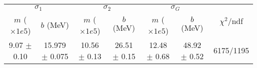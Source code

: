 \begin{tabular}{cc|cc|cc||c}
\multicolumn{2}{c|}{$\sigma_1$} & \multicolumn{2}{|c}{$\sigma_2$} & \multicolumn{2}{|c}{$\sigma_G$}  & \multirow{2}{*}{$\chi^2/$ndf}\\
$m$ ($\times1e5$) & $b$ (MeV) & $m$ ($\times1e5$) & $b$ (MeV) & $m$ ($\times1e5$) & $b$ (MeV) & \\
\hline
9.07 $\pm$ 0.10 & 15.979 $\pm$ 0.075 & 10.56 $\pm$ 0.13 & 26.51 $\pm$ 0.15 & 12.48 $\pm$ 0.68 & 48.92 $\pm$ 0.52 & 6175/1195\\
\end{tabular}
